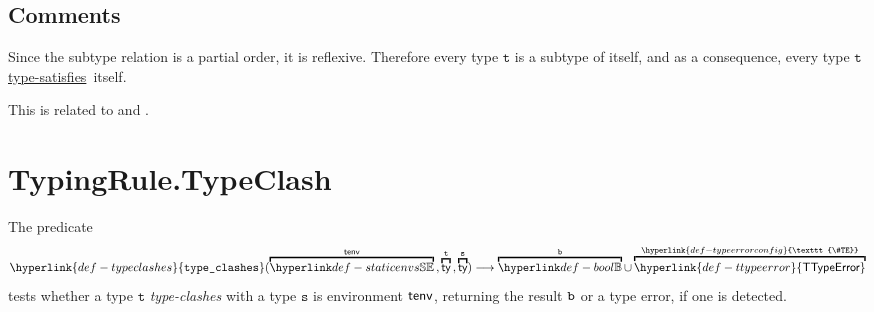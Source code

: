 \documentclass{book}
\newcommand\TTypeError[0]{\hyperlink{def-ttypeerror}{\textsf{TTypeError}}}
\newcommand\TypeErrorConfig[0]{\hyperlink{def-typeerrorconfig}{\texttt{\#TE}}}
\newcommand\typeclashes[0]{\hyperlink{def-typeclashes}{\texttt{type\_clashes}}}
\newcommand\typesatisfies[0]{\hyperlink{def-typesatisfies}{type-satisfies}}
\newcommand\vt[0]{\texttt{t}}
\newcommand\vs[0]{\texttt{s}}
\begin{document}
\subsection{Comments}
Since the subtype relation is a partial order, it is reflexive. Therefore
every type $\vt$ is a subtype of itself, and as a consequence, every type $\vt$
\typesatisfies\  itself.

This is related to  and .

\section{TypingRule.TypeClash\label{sec:TypingRule.TypeClash}}
\hypertarget{def-typeclashes}{}
The predicate
\[
  \typeclashes(\overname{\staticenvs}{\tenv} \aslsep \overname{\ty}{\vt} \aslsep \overname{\ty}{\vs})
  \aslto \overname{\Bool}{\vb} \cup \overname{\TTypeError}{\TypeErrorConfig}
\]
tests whether a type $\vt$ \emph{type-clashes} with a type $\vs$ is environment $\textsf{tenv}$,
returning the result $\texttt{b}$ or a type error, if one is detected.
\end{document}

